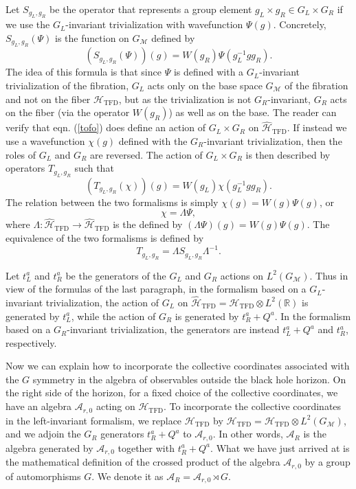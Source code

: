 \documentclass[11pt,a4paper]{article}
\def\be{\begin{equation}}
\def\ee{\end{equation}}
\def\h{\widehat}
\def\A{{\mathcal A}}
\def\R{{\mathbb R}}
\def\h{\widehat}
\def\M{{\mathcal M}}
\def\H{{\mathcal H}}
\def\TFD{{\mathrm{TFD}}}
\begin{document}
Let $S_{g_L,g_R}$ be the operator that represents a group element $g_L\times g_R\in G_L\times G_R$ if we use the $G_L$-invariant trivialization with wavefunction
$\Psi(g)$.   Concretely, $S_{g_L,g_R}(\Psi)$ is the function on $G_\M$ defined by
\be\label{tofo} (S_{g_L,g_R}(\Psi))(g)= W(g_R) \Psi(g_L^{-1} g g_R). \ee
The idea of this formula is that since $\Psi$ is defined with a $G_L$-invariant trivialization of the fibration, $G_L$ acts only on the base space $G_\M$ of the fibration
 and not on the fiber $\H_\TFD$, but as the trivialization is not $G_R$-invariant, $G_R$ acts on the fiber (via the operator $W(g_R)$) as well as on the base.
 The reader can verify that eqn. (\ref{tofo}) does define an action of $G_L\times G_R$ on $\h\H_\TFD$.   If instead we use a wavefunction $\chi(g)$ defined
 with the $G_R$-invariant trivialization, then the roles of $G_L$ and $G_R$ are reversed.    The action of $G_L\times G_R$ is then described by operators
 $T_{g_L,g_R}$ such that
 \be\label{ofo} (T_{g_L,g_R}(\chi))(g) = W(g_L) \chi(g_L^{-1} g g_R). \ee
 The relation between the two formalisms is simply $\chi(g)=W(g)\Psi(g)$, or 
 \be\label{mofo}\chi=\Lambda\Psi, \ee
 where $\Lambda:\h\H_\TFD\to \h\H_\TFD$ is the defined by $(\Lambda\Psi)(g)=W(g)\Psi(g)$.
 The equivalence of the two formalisms is defined by
 \be\label{loopy} T_{g_L,g_R}=\Lambda S_{g_L,g_R}\Lambda^{-1}. \ee
 
 Let $t_L^a$ and $t_R^a$ be the generators of the $G_L$ and $G_R$ actions on $L^2(G_\M)$.   Thus in view of the formulas of the
 last paragraph,  in the formalism based on a $G_L$-invariant trivialization, 
 the action of $G_L$ on $\h\H_\TFD=\H_\TFD\otimes L^2(\R)$ is generated by $t^a_L$, while the action of $G_R$ is generated by $t_R^a+Q^a$.
In the formalism based on a $G_R$-invariant trivialization, the generators are instead $t_L^a+Q^a$ and $t_R^a$, respectively.
 
Now we can explain how to incorporate the collective coordinates associated with the $G$ symmetry in the algebra of observables outside the black hole
horizon.   On the right side of the horizon, for a fixed choice of the collective coordinates, we have an algebra $\A_{r,0}$ acting on $\H_\TFD$.   To incorporate
the collective coordinates in the left-invariant formalism, 
we replace $\H_\TFD$ by $\h\H_\TFD=\H_\TFD\otimes L^2(G_\M)$, and we adjoin the $G_R$ generators $t_R^a+Q^a$ to $\A_{r,0}$.
In other words, $\A_R$ is the algebra generated by $\A_{r,0}$ together with $t_R^a+Q^a$.   What we have just arrived at is the mathematical definition of the
crossed product of the algebra $\A_{r,0}$ by a group of automorphisms $G$.   We denote it as $\A_R=\A_{r,0}\rtimes G$.
\end{document}

